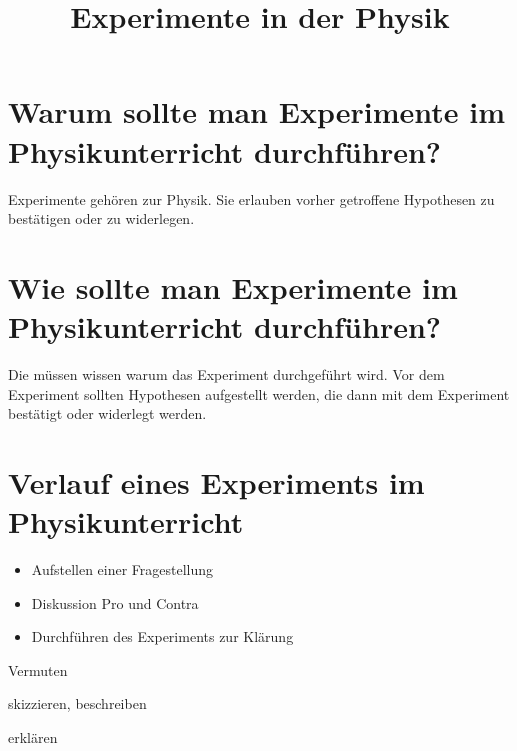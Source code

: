 \documentclass[12pt,a4paper,twoside]{article}
\title{Experimente in der Physik}
\date{}
\begin{document}
\maketitle


\section{Warum sollte man Experimente im Physikunterricht durchführen?}

Experimente gehören zur Physik. Sie erlauben vorher getroffene Hypothesen zu bestätigen oder zu widerlegen.


\section{Wie sollte man Experimente im Physikunterricht durchführen?}

Die \SuS müssen wissen warum das Experiment durchgeführt wird.
Vor dem Experiment sollten Hypothesen aufgestellt werden, die dann mit dem Experiment bestätigt oder widerlegt werden.


\section{Verlauf eines Experiments im Physikunterricht}
\begin{itemize}
	\item Aufstellen einer Fragestellung
	\item Diskussion Pro und Contra
	\item Durchführen des Experiments zur Klärung
\end{itemize}


Vermuten

skizzieren, beschreiben

erklären
\end{document}
